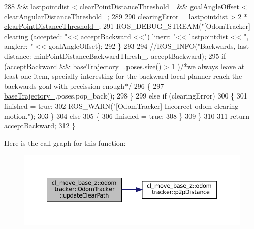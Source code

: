 \begin{DoxyCode}
288                                         && lastpointdist < 
      \hyperlink{classcl__move__base__z_1_1odom__tracker_1_1OdomTracker_a7155d25d0e8dd9f237a79ff503b80e26}{clearPointDistanceThreshold\_} && goalAngleOffset < 
      \hyperlink{classcl__move__base__z_1_1odom__tracker_1_1OdomTracker_a1b79dd86745adfb31db822e0c8106282}{clearAngularDistanceThreshold\_};
289 
290                     clearingError = lastpointdist > 2 * 
      \hyperlink{classcl__move__base__z_1_1odom__tracker_1_1OdomTracker_a7155d25d0e8dd9f237a79ff503b80e26}{clearPointDistanceThreshold\_};
291                     ROS\_DEBUG\_STREAM(\textcolor{stringliteral}{"[OdomTracker] clearing (accepted: "}<< acceptBackward <<\textcolor{stringliteral}{") linerr: "}<<
       lastpointdist << \textcolor{stringliteral}{", anglerr: "} << goalAngleOffset);
292                 \}
293 
294                 \textcolor{comment}{//ROS\_INFO("Backwards, last distance: %
       minPointDistanceBackwardThresh\_, acceptBackward);}
295                 \textcolor{keywordflow}{if} (acceptBackward && \hyperlink{classcl__move__base__z_1_1odom__tracker_1_1OdomTracker_a466d18a86df049f0f680e043bb5ea91f}{baseTrajectory\_}.poses.size() > 1 )\textcolor{comment}{/*we always leave at
       least one item, specially interesting for the backward local planner reach the backwards goal with
       precission enough*/}
296                 \{
297                     \hyperlink{classcl__move__base__z_1_1odom__tracker_1_1OdomTracker_a466d18a86df049f0f680e043bb5ea91f}{baseTrajectory\_}.poses.pop\_back();
298                 \}
299                 \textcolor{keywordflow}{else} \textcolor{keywordflow}{if} (clearingError)
300                 \{
301                     finished = \textcolor{keyword}{true};
302                     ROS\_WARN(\textcolor{stringliteral}{"[OdomTracker] Incorrect odom clearing motion."});
303                 \}
304                 \textcolor{keywordflow}{else}
305                 \{
306                     finished = \textcolor{keyword}{true};
308                 \}
309             \}
310 
311             \textcolor{keywordflow}{return} acceptBackward;
312         \}
\end{DoxyCode}
Here is the call graph for this function\+:
\nopagebreak
\begin{figure}[H]
\begin{center}
\leavevmode
\includegraphics[width=350pt]{classcl__move__base__z_1_1odom__tracker_1_1OdomTracker_abe7ba4dbf014e1f2c64b5806ce42c073_cgraph}
\end{center}
\end{figure}
